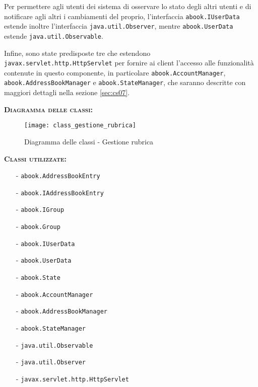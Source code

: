 \begin{description}
Per permettere agli utenti dei sistema di osservare lo stato degli altri utenti e di notificare agli altri i cambiamenti del proprio, l'interfaccia \texttt{abook.IUserData} estende inoltre l'interfaccia \texttt{java.util.Observer}, mentre \texttt{abook.UserData} estende \texttt{java.util.Observable}.

Infine, sono state predisposte tre  che estendono \texttt{javax.servlet.http.HttpServlet} per fornire ai client l'accesso alle funzionalità contenute in questo componente, in particolare \texttt{abook.AccountManager}, \texttt{abook.AddressBookManager} e \texttt{abook.StateManager}, che saranno descritte con maggiori dettagli nella sezione \vref{sec:cs07}.

	\item{\scshape\bfseries Diagramma delle classi:}
\begin{figure}[H]
  \centering
  \texttt{[image: class\_gestione\_rubrica]}
  \caption{Diagramma delle classi - Gestione rubrica}\label{fig:gestionerubrica}
\end{figure}
	
	\item{\scshape\bfseries Classi utilizzate:}\\
	\begin{itemize}[nolistsep, noitemsep]
	  \item[-] \texttt{abook.AddressBookEntry}
	  \item[-] \texttt{abook.IAddressBookEntry}
	  \item[-] \texttt{abook.IGroup}
	  \item[-] \texttt{abook.Group}
	  \item[-] \texttt{abook.IUserData}
	  \item[-] \texttt{abook.UserData}
	  \item[-] \texttt{abook.State}
	  \item[-] \texttt{abook.AccountManager}
	  \item[-] \texttt{abook.AddressBookManager}
	  \item[-] \texttt{abook.StateManager}
	  \item[-] \texttt{java.util.Observable}
	  \item[-] \texttt{java.util.Observer}
	  \item[-] \texttt{javax.servlet.http.HttpServlet}
	\end{itemize}
\end{description}

